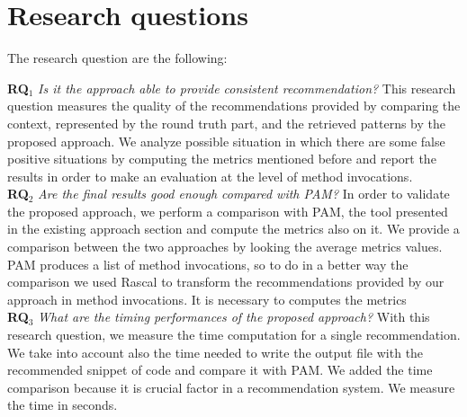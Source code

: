 \section{Research questions}
The research question are the following:

\textbf{RQ$_1$} \textit{ Is it the approach able to provide consistent recommendation?}
This research question measures the quality of the recommendations provided by comparing the context, represented by the round truth part, and the retrieved patterns by the proposed approach. We analyze possible situation in which there are some false positive situations by computing the metrics mentioned before and report the results in order to make an evaluation at the level of method invocations.\\
\textbf{RQ$_2$} \textit{Are the final results good enough compared with PAM?} In order to validate the proposed approach, we perform a comparison with PAM, the tool presented in the existing approach section and compute the metrics also on it. We provide a comparison between the two approaches by looking the average metrics values. PAM produces a list of method invocations, so to do in a better way the comparison we used Rascal to transform the recommendations provided by our approach in method invocations. It is necessary to computes the metrics\\

\textbf{RQ$_3$} \textit{What are the timing performances of the proposed approach?} With this research question, we measure the time computation for a single recommendation. We take into account also the time needed to write the output file with the recommended snippet of code and compare it with PAM. We added the time comparison because it is crucial factor in a recommendation system. We measure the time in seconds.\\

